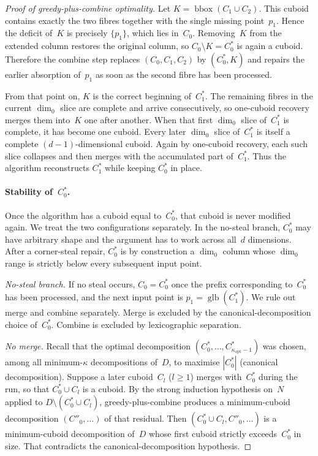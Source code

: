 \documentclass[manuscript,screen,review]{acmart}
\theoremstyle{definition}
\theoremstyle{plain}
\begin{document}
\begin{proof}[Proof of greedy-plus-combine optimality]
Let $K = \operatorname{bbox}(C_1 \cup C_2)$. This cuboid contains
exactly the two fibres together with the single missing point~$p_1$.
Hence the deficit of~$K$ is precisely $\{p_1\}$, which lies in~$C_0$.
Removing~$K$ from the extended column restores the original column, so
$C_0 \setminus K = C^*_0$ is again a cuboid. Therefore the combine
step replaces $(C_0, C_1, C_2)$ by $(C^*_0, K)$ and repairs the
earlier absorption of~$p_1$ as soon as the second fibre has been
processed.

From that point on, $K$ is the correct beginning of~$C^*_1$. The remaining fibres in the current $\dim_0$ slice are complete and arrive consecutively, so one-cuboid recovery merges them into~$K$ one after another. When that first $\dim_0$ slice of~$C^*_1$ is complete, it has become one cuboid. Every later $\dim_0$ slice of~$C^*_1$ is itself a complete $(d{-}1)$-dimensional cuboid. Again by one-cuboid recovery, each such slice collapses and then merges with the accumulated part of~$C^*_1$. Thus the algorithm reconstructs $C^*_1$ while keeping $C^*_0$ in place.

\paragraph{Stability of~$C^*_0$.}
Once the algorithm has a cuboid equal to~$C^*_0$, that cuboid is never
modified again. We treat the two configurations separately. In the
no-steal branch, $C^*_0$ may have arbitrary shape and the argument has
to work across all~$d$ dimensions. After a corner-steal repair,
$C^*_0$ is by construction a $\dim_0$ column whose $\dim_0$ range is
strictly below every subsequent input point.

\emph{No-steal branch.}
If no steal occurs, $C_0 = C^*_0$ once the prefix corresponding
to~$C^*_0$ has been processed, and the next input point is
$p_1 = \operatorname{glb}(C^*_1)$. We rule out merge and combine
separately. Merge is excluded by the canonical-decomposition choice
of~$C^*_0$. Combine is excluded by lexicographic separation.

\emph{No merge.}
Recall that the optimal decomposition
$(C^*_0, \ldots, C^*_{\kappa_{\mathrm{opt}}-1})$ was chosen, among
all minimum-$\kappa$ decompositions of~$D$, to maximise $|C^*_0|$
(canonical decomposition). Suppose a later cuboid~$C_l$ ($l \geq 1$)
merges with~$C^*_0$ during the run, so that $C^*_0 \cup C_l$ is a
cuboid. By the strong induction hypothesis on~$N$ applied to
$D \setminus (C^*_0 \cup C_l)$, greedy-plus-combine produces a
minimum-cuboid decomposition $(C''_0, \ldots)$ of that residual. Then
$(C^*_0 \cup C_l, C''_0, \ldots)$ is a minimum-cuboid decomposition
of~$D$ whose first cuboid strictly exceeds~$C^*_0$ in size. That
contradicts the canonical-decomposition hypothesis.


\end{proof}
\end{document}
